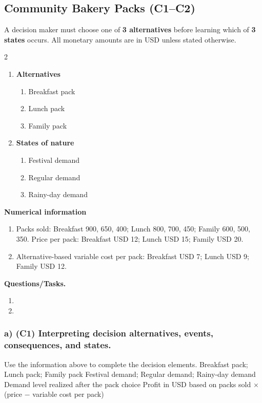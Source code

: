 \subsection{Community Bakery Packs (C1--C2)}
\label{sec:problem4-community-bakery-packs-c1-c2}
A decision maker must choose one of \textbf{3 alternatives} before learning which of \textbf{3 states} occurs. All monetary amounts are in USD unless stated otherwise.
\begin{multicols}{2}
\begin{enumerate}[label=\arabic*.]
 \item \textbf{Alternatives}
 \begin{enumerate}[label=\roman*)]
  \item Breakfast pack
  \item Lunch pack
  \item Family pack
 \end{enumerate}
 \item \textbf{States of nature}
 \begin{enumerate}[label=\roman*)]
  \item Festival demand
  \item Regular demand
  \item Rainy-day demand
 \end{enumerate}
\end{enumerate}
\end{multicols}
 \textbf{Numerical information}
 \begin{enumerate}[label=\roman*)]
  \item Packs sold: Breakfast 900, 650, 400; Lunch 800, 700, 450; Family 600, 500, 350. Price per pack: Breakfast USD 12; Lunch USD 15; Family USD 20.
  \item Alternative-based variable cost per pack: Breakfast USD 7; Lunch USD 9; Family USD 12.
 \end{enumerate}


\textbf{Questions/Tasks.}
\begin{enumerate}[label=\textbf{\alph*)}]
 \item {}
 \item {}
\end{enumerate}
\subsubsection*{a) \textbf{(C1)} Interpreting decision alternatives, events, consequences, and states.}
\label{subsec:problem4-community-bakery-packs-c1}
Use the information above to complete the decision elements.
\DecisionElementsTable
{Breakfast pack; Lunch pack; Family pack}
{Festival demand; Regular demand; Rainy-day demand}
{Demand level realized after the pack choice}
{Profit in USD based on packs sold $\times$ (price $-$ variable cost per pack)}
